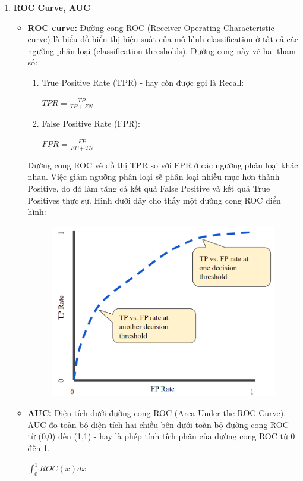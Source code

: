 \begin{enumerate}
        \item \textbf{ROC Curve, AUC} \cite{roc_auc}
    \begin{itemize}
        \item \textbf{ROC curve:} Đường cong ROC (Receiver Operating Characteristic curve) là biểu đồ hiển thị hiệu suất của mô hình classification ở tất cả các ngưỡng phân loại (classification thresholds). Đường cong này vẽ hai tham số: 
        \begin{enumerate}
            \item True Positive Rate (TPR) - hay còn được gọi là Recall:
            \begin{center}
             \large $TPR = \frac{TP}{TP + FN}$
            \end{center}
            \item False Positive Rate (FPR):
            \begin{center}
             \large $FPR = \frac{FP}{FP + TN}$
            \end{center}
        \end{enumerate}
        Đường cong ROC vẽ đồ thị TPR so với FPR ở các ngưỡng phân loại khác nhau. Việc giảm ngưỡng phân loại sẽ phân loại nhiều mục hơn thành Positive, do đó làm tăng cả kết quả False Positive và kết quả True Positives thực sự. Hình dưới đây cho thấy một đường cong ROC điển hình:
        \begin{figure}[H]
            \centering
            \includegraphics[width=0.5\linewidth]{img/ROC.png}
        \end{figure}
        \item \textbf{AUC:} Diện tích dưới đường cong ROC (Area Under the ROC Curve). AUC đo toàn bộ diện tích hai chiều bên dưới toàn bộ đường cong ROC từ (0,0) đến (1,1) - hay là phép tính tích phân của đường cong ROC từ 0 đến 1.
        \begin{center}
        \large $\int_{0}^{1} ROC(x)dx$
        \end{center}
        \begin{figure}[H]

\end{figure}
\end{itemize}
\end{enumerate}
